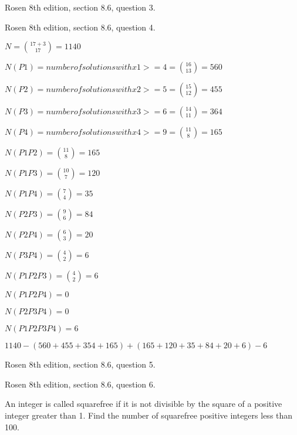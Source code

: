 \newpage
\nextq Rosen 8th edition, section 8.6, question 3.

\SOLUTION



\newpage
\nextq Rosen 8th edition, section 8.6, question 4.

\SOLUTION
$ N = \binom{17+3}{17} = 1140$

$N(P1) = number of solutions with x1 >= 4 = \binom{16}{13} = 560$

$N(P2) = number of solutions with x2 >= 5 = \binom{15}{12} = 455$

$N(P3) = number of solutions with x3 >= 6 = \binom{14}{11} = 364$

$N(P4) = number of solutions with x4 >= 9 = \binom{11}{8} = 165$

$N(P1P2) = \binom{11}{8} = 165$

$N(P1P3) = \binom{10}{7} = 120$

$N(P1P4) = \binom{7}{4} = 35$

$N(P2P3) = \binom{9}{6} = 84$

$N(P2P4) = \binom{6}{3} = 20$

$N(P3P4) = \binom{4}{2} = 6$

$N(P1P2P3) = \binom{4}{2} = 6$

$N(P1P2P4) = 0$

$N(P2P3P4) = 0$

$N(P1P2P3P4) = 6$

$1140 - (560+455+354+165) + (165+120+35+84+20+6) - 6$




\newpage
\nextq Rosen 8th edition, section 8.6, question 5.

\SOLUTION



\newpage
\nextq Rosen 8th edition, section 8.6, question 6.

An integer is called squarefree if it is not divisible by
the square of a positive integer greater than 1. Find the
number of squarefree positive integers less than 100.

\SOLUTION

